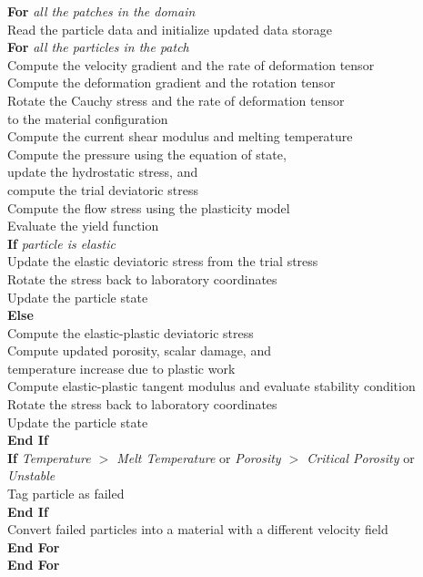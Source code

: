 \begin{table}[p]
\begin{tabbing}
    {\bf For} {\it all the patches in the domain}\\
      \> Read the particle data and initialize updated data storage\\
      \> {\bf For} {\it all the particles in the patch}\\
      \>\>   Compute the velocity gradient and the rate of deformation tensor\\
      \>\>   Compute the deformation gradient and the rotation tensor\\
      \>\>   Rotate the Cauchy stress and the rate of deformation tensor \\
      \>\>\> to the material configuration\\
      \>\>   Compute the current shear modulus and melting temperature\\
      \>\>   Compute the pressure using the equation of state,  \\
      \>\>\>  update the hydrostatic stress, and  \\
      \>\>\>  compute the trial deviatoric stress\\
      \>\>   Compute the flow stress using the plasticity model\\
      \>\>   Evaluate the yield function\\
      \>\>   {\bf If} {\it particle is elastic} \\
      \>\>\>     Update the elastic deviatoric stress from the trial stress\\
      \>\>\>     Rotate the stress back to laboratory coordinates\\
      \>\>\>     Update the particle state\\
      \>\>   {\bf Else} \\
      \>\>\>     Compute the elastic-plastic deviatoric stress\\
      \>\>\>     Compute updated porosity, scalar damage, and \\
      \>\>\>\>       temperature increase due to plastic work\\
      \>\>\>     Compute elastic-plastic tangent modulus and
                     evaluate stability condition\\
      \>\>\>     Rotate the stress back to laboratory coordinates\\
      \>\>\>     Update the particle state\\
      \>\>   {\bf End If} \\
      \>\>  {\bf If}
             {\it Temperature $>$ Melt Temperature} or
             {\it Porosity $>$ Critical Porosity} or
             {\it Unstable}\\
      \>\>\>       Tag particle as failed\\
      \>\>  {\bf End If} \\
      \>\> Convert failed particles into a material with a different
           velocity field \\
      \> {\bf End For} \\
    {\bf End For}
    \end{tabbing}
  \end{table}

